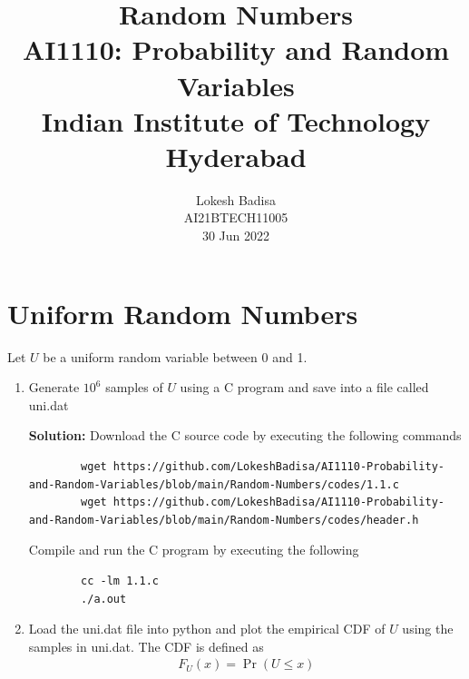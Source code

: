 \documentclass[journal,12pt,twocolumn]{IEEEtran}
\title{Random Numbers \\ \Large AI1110: Probability and Random Variables \\ \large Indian Institute of Technology Hyderabad}
\author{Lokesh Badisa \\ \normalsize AI21BTECH11005 \\ \vspace*{20pt} \normalsize  30 Jun 2022}
\newcommand{\solution}{\noindent \textbf{Solution: }}
\providecommand{\pr}[1]{\ensuremath{\Pr\left(#1\right)}}
\numberwithin{equation}{section}
\renewcommand\thesection{\arabic{section}}
\begin{document}
	\maketitle
	
	\section{Uniform Random Numbers}
	Let $U$ be a uniform random variable between 0 and 1.
	\begin{enumerate}[label=\thesection.\arabic*,ref=\thesection.\theenumi]
	\item Generate $10^6$ samples of $U$ using a C program and save into a file called uni.dat

	\solution Download the C source code by executing the following commands
	\begin{lstlisting}
		wget https://github.com/LokeshBadisa/AI1110-Probability-and-Random-Variables/blob/main/Random-Numbers/codes/1.1.c
		wget https://github.com/LokeshBadisa/AI1110-Probability-and-Random-Variables/blob/main/Random-Numbers/codes/header.h
	\end{lstlisting}
	Compile and run the C program by executing the following
	\begin{lstlisting}
		cc -lm 1.1.c
		./a.out
	\end{lstlisting}
	
	\item Load the uni.dat file into python and plot the empirical CDF of $U$ using the samples in uni.dat. The CDF is defined as
	\begin{align}
		F_{U}(x) = \pr{U \le x}
	\end{align}


\end{enumerate}
\end{document}
